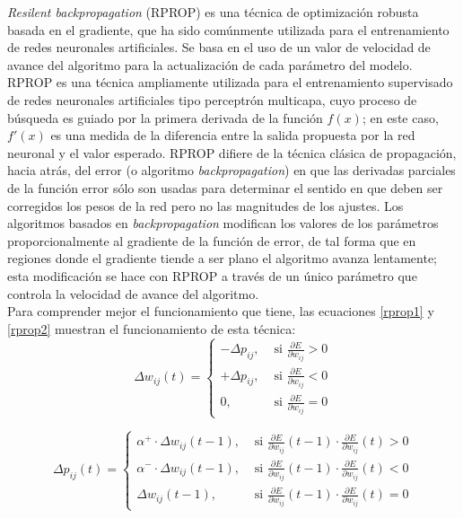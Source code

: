 			\textit{Resilent backpropagation} (RPROP) \cite{RPROP} es una técnica de optimización robusta basada en el gradiente, que ha sido comúnmente utilizada para el entrenamiento de redes neuronales artificiales. Se basa en el uso de un valor de velocidad de avance del algoritmo para la actualización de cada parámetro del modelo.\\
	
			RPROP es una técnica ampliamente utilizada para el entrenamiento supervisado de redes neuronales artificiales tipo perceptrón multicapa, cuyo proceso de búsqueda es guiado por la primera derivada de la función $f(x)$; en este caso, $f'(x)$ es una medida de la diferencia entre la salida propuesta por la red neuronal y el valor esperado. RPROP difiere de la técnica clásica de propagación, hacia atrás, del error (o algoritmo \textit{backpropagation}) en que las derivadas parciales de la función error sólo son usadas para determinar el sentido en que deben ser corregidos los pesos de la red pero no las magnitudes de los ajustes. Los algoritmos basados en \textit{backpropagation} modifican los valores de los parámetros proporcionalmente al gradiente de la función de error, de tal forma que en regiones donde el gradiente tiende a ser plano el algoritmo avanza lentamente; esta modificación se hace con RPROP a través de un único parámetro que controla la velocidad de avance del algoritmo.\\
			
			Para comprender mejor el funcionamiento que tiene, las ecuaciones \ref{rprop1} y \ref{rprop2} muestran el funcionamiento de esta técnica:\\
			
			\begin{equation}
				\Delta w_{ij} (t) =
				\begin{cases}
					{ -\Delta p_{ij},} & \mbox{ si } \frac{ \partial E}{ \partial w_{ij}} > 0 \\
					{ +\Delta p_{ij},} & \mbox{ si } \frac{ \partial E}{ \partial w_{ij}} < 0 \\
					0, & \mbox{ si } \frac{ \partial E}{ \partial w_{ij}} = 0
				\end{cases}
				\label{rprop1}
			\end{equation}
				
			\begin{equation}
				\Delta p_{ij} (t) = 
				\begin{cases}
					{ \alpha^+ \cdot{} \Delta w_{ij}(t-1),} & \mbox{ si } \frac{ \partial E}{ \partial w_{ij}}(t-1) \cdot{} \frac{ \partial E}{ \partial w_{ij}}(t) > 0 \\
					{ \alpha^- \cdot{} \Delta w_{ij}(t-1),} & \mbox{ si } \frac{ \partial E}{ \partial w_{ij}}(t-1) \cdot{} \frac{ \partial E}{ \partial w_{ij}}(t) < 0 \\
					\Delta w_{ij}(t-1), & \mbox{ si } \frac{ \partial E}{ \partial w_{ij}}(t-1) \cdot{} \frac{ \partial E}{ \partial w_{ij}}(t) = 0
				\end{cases}
				\label{rprop2}
			\end{equation}
			
